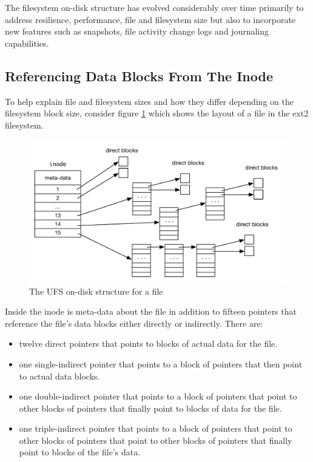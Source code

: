 \noindent 
The filesystem on-disk structure has evolved considerably over time primarily to address resilience, performance, file and filesystem size but also to incorporate new features such as snapshots, file activity change logs and journaling capabilities.


\subsection{Referencing Data Blocks From The Inode}

To help explain file and filesystem sizes and how they differ depending on the filesystem block size, consider figure \ref{fig:indirects} which shows the layout of a file in the ext2 filesystem. 

\begin{figure}[h]
	\includegraphics[scale=0.6]{figures/indirects.pdf}
	\centering
	\caption{The UFS on-disk structure for a file}
	\label{fig:indirects}
\end{figure}

\noindent
Inside the inode is meta-data about the file in addition to fifteen pointers that reference the file's data blocks either directly or indirectly. There are:

\begin{itemize}
	\item twelve direct pointers that points to blocks of actual data for the file.
	\item one single-indirect pointer that points to a block of pointers that then point to actual data blocks.
	\item one double-indirect pointer that points to a block of pointers that point to other blocks of pointers 
		that finally point to blocks of data for the file.
	\item one triple-indirect pointer that points to a block of pointers that point to other blocks of pointers 
		that point to other blocks of pointers that finally point to blocks of the file's data.
\end{itemize}

